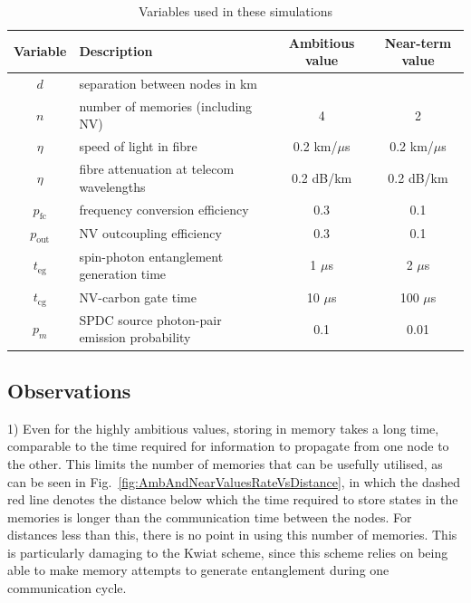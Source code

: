 \documentclass[aps,pra,superscriptaddress,preprint]{revtex4-1}
\begin{document}
\begin{table}[ht]
\caption{Variables used in these simulations}
\begin{center}
\begin{tabular}{|c|l|c|c|}
\hline
Variable & Description & Ambitious value & Near-term value \\ \hline
$d$ & separation between nodes in km & & \\
$n$ & number of memories (including NV) & 4 & 2 \\
$\eta$ & speed of light in fibre & 0.2 km/$\mu$s & 0.2 km/$\mu$s \\
$\eta$ & fibre attenuation at telecom wavelengths & 0.2 dB/km & 0.2 dB/km \\
$p_\text{fc}$ & frequency conversion efficiency & 0.3 & 0.1 \\
$p_\text{out}$ & NV outcoupling efficiency & 0.3 & 0.1 \\
$t_\text{eg}$ & spin-photon entanglement generation time &1 $\mu$s & 2 $\mu$s\\
$t_\text{cg}$ & NV-carbon gate time  & 10 $\mu$s & 100 $\mu$s \\
$p_m$ & SPDC source photon-pair emission probability  & 0.1 & 0.01 \\ \hline
\end{tabular}
\end{center}
\label{tab:Variables}
\end{table}%

%

\subsection{Observations}

1) Even for the highly ambitious values, storing in memory takes a long time, comparable to the time required for information to propagate from one node to the other. This limits the number of memories that can be usefully utilised, as can be seen in Fig.~\ref{fig:AmbAndNearValuesRateVsDistance}, in which the dashed red line denotes the distance below which the time required to store states in the memories is longer than the communication time between the nodes. For distances less than this, there is no point in using this number of memories. This is particularly damaging to the Kwiat scheme, since this scheme relies on being able to make memory attempts to generate entanglement during one communication cycle.
\end{document}
